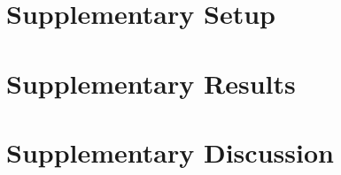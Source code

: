 \documentclass{article}
\begin{document}
\section{Supplementary Setup}
\section{Supplementary Results}
\section{Supplementary Discussion}
\end{document}
